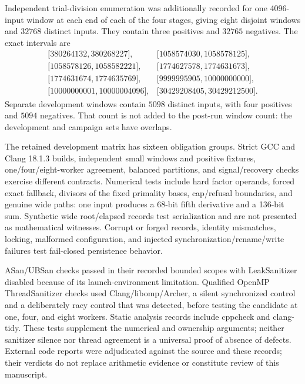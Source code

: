 \documentclass[11pt,a4paper]{article}
\theoremstyle{definition}
\theoremstyle{remark}
\begin{document}
Independent trial-division enumeration was additionally recorded for one
4096-input window at each end of each of the four stages, giving eight
disjoint windows and $32768$ distinct inputs. They contain three positives and $32765$
negatives. The exact intervals are
\begin{equation}\label{eq:windows}
\begin{array}{rr}
\lbrack380264132,380268227\rbrack, &\lbrack1058574030,1058578125\rbrack,\\
\lbrack1058578126,1058582221\rbrack, &\lbrack1774627578,1774631673\rbrack,\\
\lbrack1774631674,1774635769\rbrack, &\lbrack9999995905,10000000000\rbrack,\\
\lbrack10000000001,10000004096\rbrack, &\lbrack30429208405,30429212500\rbrack.
\end{array}
\end{equation}
Separate development windows contain $5098$ distinct inputs, with four
positives and $5094$ negatives. That count is not added to the post-run
window count: the development and campaign sets have overlaps.

The retained development matrix has sixteen obligation groups. Strict
GCC and Clang 18.1.3 builds, independent small windows and positive
fixtures, one/four/eight-worker agreement, balanced partitions, and
signal/recovery checks exercise different contracts. Numerical tests
include hard factor operands, forced exact fallback, divisors of the
fixed primality bases, cap/refusal boundaries, and genuine wide paths:
one input produces a 68-bit fifth derivative and a 136-bit sum. Synthetic
wide root/elapsed records test serialization and are not presented as
mathematical witnesses. Corrupt or forged records, identity mismatches,
locking, malformed configuration, and injected synchronization/rename/write
failures test fail-closed persistence behavior.

ASan/UBSan checks passed in their recorded bounded scopes with
LeakSanitizer disabled because of its launch-environment limitation.
Qualified OpenMP ThreadSanitizer checks used Clang/libomp/Archer, a silent
synchronized control and a deliberately racy control that was detected,
before testing the candidate at one, four, and eight workers. Static
analysis records include cppcheck and clang-tidy. These tests supplement
the numerical and ownership arguments; neither sanitizer silence nor
thread agreement is a universal proof of absence of defects. External
code reports were adjudicated against the source and these records;
their verdicts do not replace arithmetic evidence or constitute review
of this manuscript.
\end{document}
